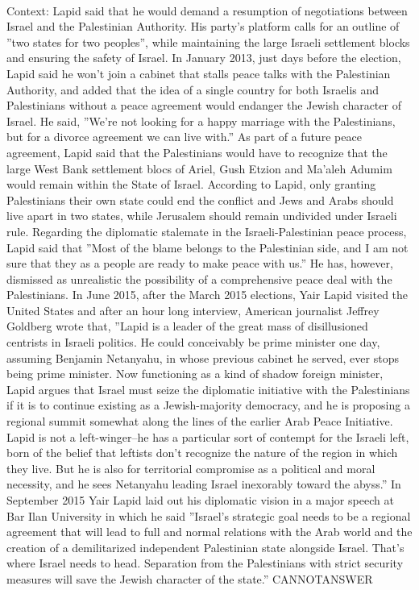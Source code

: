 \documentclass[11pt,a4paper, onecolumn]{article}
\begin{document}
\\ Context: Lapid said that he would demand a resumption of negotiations between Israel and the Palestinian Authority. His party's platform calls for an outline of ''two states for two peoples'', while maintaining the large Israeli settlement blocks and ensuring the safety of Israel. In January 2013, just days before the election, Lapid said he won't join a cabinet that stalls peace talks with the Palestinian Authority, and added that the idea of a single country for both Israelis and Palestinians without a peace agreement would endanger the Jewish character of Israel. He said, ''We're not looking for a happy marriage with the Palestinians, but for a divorce agreement we can live with.''  As part of a future peace agreement, Lapid said that the Palestinians would have to recognize that the large West Bank settlement blocs of Ariel, Gush Etzion and Ma'aleh Adumim would remain within the State of Israel. According to Lapid, only granting Palestinians their own state could end the conflict and Jews and Arabs should live apart in two states, while Jerusalem should remain undivided under Israeli rule. Regarding the diplomatic stalemate in the Israeli-Palestinian peace process, Lapid said that ''Most of the blame belongs to the Palestinian side, and I am not sure that they as a people are ready to make peace with us.'' He has, however, dismissed as unrealistic the possibility of a comprehensive peace deal with the Palestinians. In June 2015, after the March 2015 elections, Yair Lapid visited the United States and after an hour long interview, American journalist Jeffrey Goldberg wrote that, ''Lapid is a leader of the great mass of disillusioned centrists in Israeli politics. He could conceivably be prime minister one day, assuming Benjamin Netanyahu, in whose previous cabinet he served, ever stops being prime minister. Now functioning as a kind of shadow foreign minister, Lapid argues that Israel must seize the diplomatic initiative with the Palestinians if it is to continue existing as a Jewish-majority democracy, and he is proposing a regional summit somewhat along the lines of the earlier Arab Peace Initiative. Lapid is not a left-winger--he has a particular sort of contempt for the Israeli left, born of the belief that leftists don't recognize the nature of the region in which they live. But he is also for territorial compromise as a political and moral necessity, and he sees Netanyahu leading Israel inexorably toward the abyss.'' In September 2015 Yair Lapid laid out his diplomatic vision in a major speech at Bar Ilan University  in which he said ''Israel's strategic goal needs to be a regional agreement that will lead to full and normal relations with the Arab world and the creation of a demilitarized independent Palestinian state alongside Israel. That's where Israel needs to head. Separation from the Palestinians with strict security measures will save the Jewish character of the state.'' CANNOTANSWER
\end{document}
